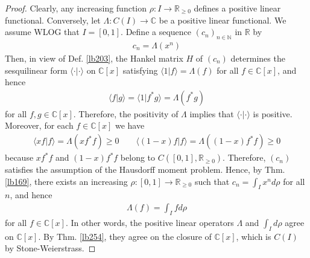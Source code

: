\documentclass[12pt,b5paper,notitlepage]{article}
\theoremstyle{definition}
\theoremstyle{plain}
\newcommand{\bk}[1]{\langle {#1}\rangle}
\newcommand{\Cbb}{\mathbb C}
\newcommand{\Nbb}{\mathbb N}
\newcommand{\Rbb}{\mathbb R}
\numberwithin{equation}{section}
\begin{document}
\begin{proof}
Clearly, any increasing function $\rho:I\rightarrow\Rbb_{\geq0}$ defines a positive linear functional. Conversely, let $\Lambda:C(I)\rightarrow\Cbb$ be a positive linear functional. We assume WLOG that $I=[0,1]$. Define a sequence $(c_n)_{n\in\Nbb}$ in $\Rbb$ by
\begin{align*}
c_n=\Lambda(x^n)
\end{align*}
Then, in view of Def. \ref{lb203}, the Hankel matrix $H$ of $(c_n)$ determines the sesquilinear form $\bk{\cdot|\cdot}$ on $\Cbb[x]$ satisfying $\bk{1|f}=\Lambda(f)$ for all $f\in\Cbb[x]$, and hence
\begin{align*}
\bk{f|g}=\bk{1|f^*g}=\Lambda(f^*g)
\end{align*}
for all $f,g\in\Cbb[x]$. Therefore, the positivity of $\Lambda$ implies that $\bk{\cdot|\cdot}$ is positive. Moreover, for each $f\in\Cbb[x]$ we have
\begin{align*}
\bk{xf|f}=\Lambda(xf^*f)\geq0\qquad \bk{(1-x)f|f}=\Lambda((1-x)f^*f)\geq0
\end{align*}
because $xf^*f$ and $(1-x)f^*f$ belong to $C([0,1],\Rbb_{\geq0})$. Therefore, $(c_n)$ satisfies the assumption of the Hausdorff moment problem. Hence, by Thm. \ref{lb169}, there exists an increasing $\rho:[0,1]\rightarrow\Rbb_{\geq0}$ such that $c_n=\int_Ix^nd\rho$ for all $n$, and hence
\begin{align*}
\Lambda(f)=\int_Ifd\rho
\end{align*}
for all $f\in\Cbb[x]$. In other words, the positive linear operators $\Lambda$ and $\int_Id\rho$ agree on $\Cbb[x]$. By Thm. \ref{lb254}, they agree on the closure of $\Cbb[x]$, which is $C(I)$ by Stone-Weierstrass.
\end{proof}
\end{document}
